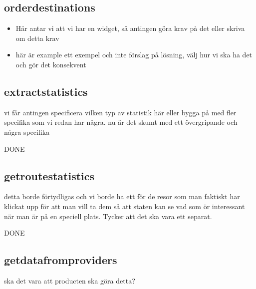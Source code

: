 \documentclass[a4paper]{article}
\begin{document}
		
	\subsection{orderdestinations}
		\begin{itemize}
			\item Här antar vi att vi har en widget, så antingen göra krav på det eller skriva om detta krav
			\item här är example ett exempel och inte förslag på lösning, välj hur vi ska ha det och gör det konsekvent
 		
		\end{itemize}
		
	\subsection{extractstatistics}
vi får antingen specificera vilken typ av statistik  här eller bygga på med  fler specifika som vi redan har några. nu är det skumt med ett övergripande och några specifika


	DONE		
	\subsection{getroutestatistics}
	detta borde förtydligas och vi borde ha ett för de resor som man faktiskt har klickat upp för att man vill ta dem så att staten kan se vad som ör interessant när man är på en speciell plats. Tycker att det ska vara ett separat.
	
	DONE

	\subsection{getdatafromproviders}
	ska det vara att producten ska göra detta?
	
\end{document}
